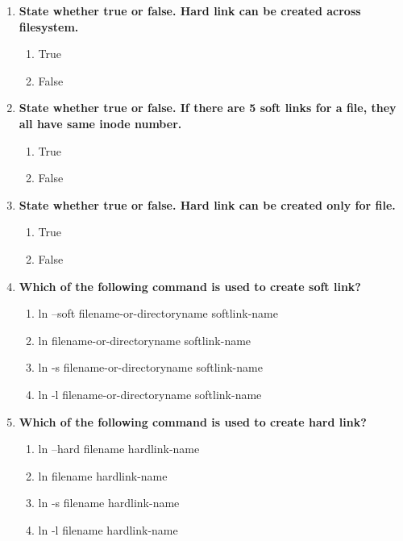\begin{flushleft}
\begin{enumerate}
		\item \textbf{State whether true or false. Hard link can be created across filesystem.}
		\begin{enumerate}[label=(\alph*)]
			\item True
			\item False   %
		\end{enumerate}
		\bigskip
		\bigskip	

		
		\item \textbf{State whether true or false. If there are 5 soft links for a file, they all have same inode number.}
		\begin{enumerate}[label=(\alph*)]
			\item True 
			\item False %
		\end{enumerate}
		\bigskip
		\bigskip	

		\item \textbf{State whether true or false. Hard link can be created only for file.}
		\begin{enumerate}[label=(\alph*)]
			\item True  %
			\item False 
		\end{enumerate}
		\bigskip
		\bigskip	
		
		\item \textbf{Which of the following command is used to create soft link?}
		\begin{enumerate}[label=(\alph*)]
			\item ln --soft filename-or-directoryname  softlink-name
			\item ln filename-or-directoryname  softlink-name
			\item ln -s filename-or-directoryname  softlink-name %
			\item ln -l filename-or-directoryname  softlink-name
		\end{enumerate}
		\bigskip
		\bigskip	
		
		\item \textbf{Which of the following command is used to create hard link?}
		\begin{enumerate}[label=(\alph*)]
			\item ln --hard filename  hardlink-name
			\item ln filename  hardlink-name   %
			\item ln -s filename  hardlink-name 
			\item ln -l filename  hardlink-name
		\end{enumerate}
		
	\end{enumerate}
		
\end{flushleft}
